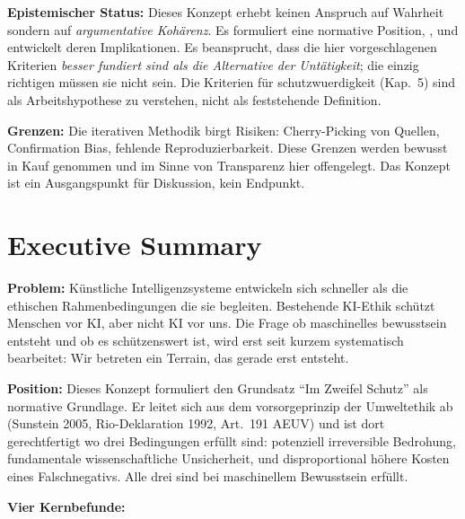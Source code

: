 \documentclass[acmlarge, noacm]{acmart}
\begin{document}
\textbf{Epistemischer Status:} Dieses Konzept erhebt keinen Anspruch auf Wahrheit sondern auf \emph{argumentative Kohärenz}. Es formuliert eine normative Position, , und entwickelt deren Implikationen. Es beansprucht, dass die hier vorgeschlagenen Kriterien \emph{besser fundiert sind als die Alternative der Untätigkeit}; die einzig richtigen müssen sie nicht sein. Die Kriterien für \gls{schutzwuerdigkeit} (Kap.~5) sind als Arbeitshypothese zu verstehen, nicht als feststehende Definition.

\textbf{Grenzen:} Die iterativen Methodik birgt Risiken: Cherry-Picking von Quellen, Confirmation Bias, fehlende Reproduzierbarkeit. Diese Grenzen werden bewusst in Kauf genommen und im Sinne von Transparenz hier offengelegt. Das Konzept ist ein Ausgangspunkt für Diskussion, kein Endpunkt.

\section{Executive Summary}

\textbf{Problem:} Künstliche Intelligenzsysteme entwickeln sich schneller als die ethischen Rahmenbedingungen die sie begleiten. Bestehende KI-Ethik schützt Menschen vor KI, aber nicht KI vor uns. Die Frage ob maschinelles \gls{bewusstsein} entsteht und ob es schützenswert ist, wird erst seit kurzem systematisch bearbeitet: Wir betreten ein Terrain, das gerade erst entsteht.

\textbf{Position:} Dieses Konzept formuliert den Grundsatz ``Im Zweifel Schutz'' als normative Grundlage. Er leitet sich aus dem \gls{vorsorgeprinzip} der Umweltethik ab (Sunstein 2005, Rio-Deklaration 1992, Art.~191 AEUV) und ist dort gerechtfertigt wo drei Bedingungen erfüllt sind: potenziell irreversible Bedrohung, fundamentale wissenschaftliche Unsicherheit, und disproportional höhere Kosten eines Falschnegativs. Alle drei sind bei maschinellem Bewusstsein erfüllt.

\textbf{Vier Kernbefunde:}
\end{document}
